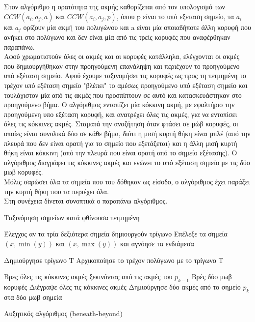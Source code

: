 \documentclass[oneside,12pt]{book}
\theoremstyle{definition}
\begin{document}
Στον αλγόριθμο η ορατότητα της ακμής καθορίζεται από τον υπολογισμό των \(CCW(a_i, a_j, a)\) και \(CCW(a_i, a_j, p)\), όπου p είναι το υπό εξεταση σημείο, τα \(a_i\) και \(a_j\) ορίζουν μία ακμή του πολυγώνου και a είναι μία οποιαδήποτε άλλη κορυφή που ανήκει στο πολύγωνο και δεν είναι μία από τις τρείς κορυφές που αναφέρθηκαν παραπάνω. \\

Αφού χρωματιστούν όλες οι ακμές και οι κορυφές κατάλληλα, ελέγχονται οι ακμές που δημιουργήθηκαν στην προηγούμενη επανάληψη και περιέχουν το προηγούμενο υπό εξέταση σημείο. Αφού έχουμε ταξινομήσει τις κορυφές ως προς τη τετμημένη το τρέχον υπό εξέταση σημείο "βλέπει" το αμέσως προηγούμενο υπό εξέταση σημείο και τουλάχιστον μία από τις ακμές που προσπίπτουν σε αυτό και κατασκευάστηκαν στο προηγούμενο βήμα. Ο αλγόριθμος εντοπίζει μία κόκκινη ακμή, με εφαλτήριο την προηγούμενη υπο εξέταση κορυφή, και ανατρέχει όλες τις ακμές, για να εντοπίσει όλες τις κόκκινες ακμές. Σταματά την αναζήτηση όταν φτάσει σε μώβ κορυφές, οι οποίες είναι συνολικά δύο σε κάθε βήμα, διότι η μισή κυρτή θήκη είναι μπλέ (από την πλευρά που δεν είναι ορατή για το σημείο που εξετάζεται) και η άλλη μισή κυρτή θήκη είναι κόκκινη (από την πλευρά που είναι ορατή από το σημείο εξέτασης). Ο αλγόριθμος διαγράφει τις κόκκινες ακμές και ενώνει το υπό εξέταση σημείο με τις δύο μωβ κορυφές. \\

Μόλις σαρώσει όλα τα σημεία που του δόθηκαν ως είσοδο, ο αλγόριθμος έχει παράξει την κυρτή θήκη που τα περιέχει όλα. \\

Στη συνέχεια δίνεται συνοπτικά ο παραπάνω αλγόριθμος. \\

\begin{algorithm}[H]
	\SetAlgoLined
		
	Ταξινόμηση σημείων κατά φθίνουσα τετμημένη \;
	
	Έλεγχος αν τα τρία δεξιότερα σημεία δημιουργούν τρίγωνο \;
	{Επέλεξε τα σημεία \((x, \min(y))\) και \((x, \max(y))\) και αγνόησε τα ενδιάμεσα\;}
	
	Δημιούργησε τρίγωνο Τ \;
	Αρχικοποίησε το τρέχον πολύγωνο με το τρίγωνο Τ \;
	
	{Βρες όλες τις κόκκινες ακμές ξεκινόντας από τις ακμές του \(p_{k-1}\) \;
		Βρές δύο μωβ κορυφές \;
		Διέγραψε όλες τις κόκκινες ακμές \;
		Δημιούργησε δύο ακμές από το σημείο \(p_k\) στα δύο μωβ σημεία \;
	}
	
	\caption{Αυξητικός αλγόριθμος (beneath-beyond)}
\end{algorithm}
\end{document}

